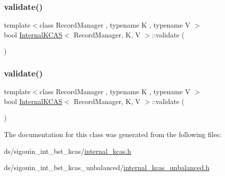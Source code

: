 \mbox{\label{classInternalKCAS_abbe352f377d39453950e11caf7c5081d}} 
\subsubsection{\texorpdfstring{validate()}{validate()}\hspace{0.1cm}{\footnotesize\ttfamily [1/2]}}
{\footnotesize\ttfamily template$<$class Record\+Manager , typename K , typename V $>$ \\
bool \hyperlink{classInternalKCAS}{Internal\+K\+C\+AS}$<$ Record\+Manager, K, V $>$\+::validate (\begin{DoxyParamCaption}{ }\end{DoxyParamCaption})}

\mbox{\label{classInternalKCAS_abbe352f377d39453950e11caf7c5081d}} 
\subsubsection{\texorpdfstring{validate()}{validate()}\hspace{0.1cm}{\footnotesize\ttfamily [2/2]}}
{\footnotesize\ttfamily template$<$class Record\+Manager , typename K , typename V $>$ \\
bool \hyperlink{classInternalKCAS}{Internal\+K\+C\+AS}$<$ Record\+Manager, K, V $>$\+::validate (\begin{DoxyParamCaption}{ }\end{DoxyParamCaption})}



The documentation for this class was generated from the following files\+:\begin{DoxyCompactItemize}
\item 
ds/sigouin\+\_\+int\+\_\+bst\+\_\+kcas/\hyperlink{internal__kcas_8h}{internal\+\_\+kcas.\+h}\item 
ds/sigouin\+\_\+int\+\_\+bst\+\_\+kcas\+\_\+unbalanced/\hyperlink{internal__kcas__unbalanced_8h}{internal\+\_\+kcas\+\_\+unbalanced.\+h}\end{DoxyCompactItemize}
